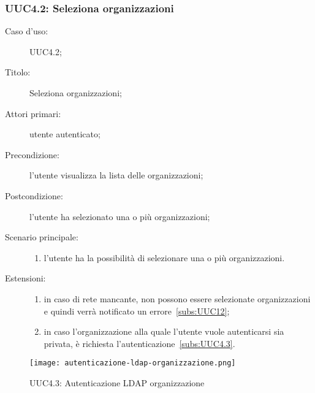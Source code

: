 \documentclass[../../../analisi-dei-requisiti.tex]{subfiles}
\begin{document}
\subsubsection{UUC4.2: Seleziona organizzazioni}%
\label{subs:UUC4.2}
\begin{description}
  \item[Caso d’uso:] UUC4.2;
  \item[Titolo:] Seleziona organizzazioni;
  \item[Attori primari:] utente autenticato;
  \item[Precondizione:] l'utente visualizza la lista delle organizzazioni;
  \item[Postcondizione:] l'utente ha selezionato una o più organizzazioni;
  \item[Scenario principale:]
        \begin{enumerate}
          \item l'utente ha la possibilità di selezionare una o più organizzazioni.
        \end{enumerate}
  \item[Estensioni:]
        \begin{enumerate}
          \item in caso di rete mancante, non possono essere selezionate organizzazioni e quindi verrà notificato un errore~\ref{subs:UUC12};
          \item in caso l'organizzazione alla quale l'utente vuole autenticarsi sia privata, è richiesta l'autenticazione~\ref{subs:UUC4.3}.
        \end{enumerate}
\end{description}

\begin{figure}[H]
  \centering
  \texttt{[image: autenticazione-ldap-organizzazione.png]}
  \caption{UUC4.3: Autenticazione LDAP organizzazione}%
  \label{fig:uuc4.3}
\end{figure}
\end{document}
